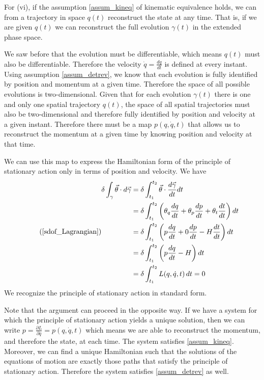 \documentclass[fleqn,10pt]{wlscirep}
\begin{document}
For (vi), if the assumption \ref{assum_kineq} of kinematic equivalence  holds, we can from a trajectory in space $q(t)$ reconstruct the state at any time. That is, if we are given $q(t)$ we can reconstruct the full evolution $\gamma(t)$ in the extended phase space.

We saw before that the evolution must be differentiable, which means $q(t)$ must also be differentiable. Therefore the velocity $\dot{q} = \frac{dq}{dt}$ is defined at every instant. Using assumption \ref{assum_detrev}, we know that each evolution is fully identified by position and momentum at a given time. Therefore the space of all possible evolutions is two-dimensional. Given that for each evolution $\gamma(t)$ there is one and only one spatial trajectory $q(t)$, the space of all spatial trajectories must also be two-dimensional and therefore fully identified by position and velocity at a given instant. Therefore there must be a map $p(q, \dot{q}, t)$ that allows us to reconstruct the momentum at a given time by knowing position and velocity at that time.

We can use this map to express the Hamiltonian form of the principle of stationary action only in terms of position and velocity. We have
\begin{equation}
\tag*{(\ref{sdof_Lagrangian})}
	\begin{aligned}
		\delta \int_\gamma \vec{\theta} \cdot d\vec{\gamma} &= \delta \int^{t_2}_{t_1} \vec{\theta} \cdot \frac{d\vec{\gamma}}{dt} dt \\
		&= \delta \int^{t_2}_{t_1} \left(\theta_q \frac{dq}{dt} + \theta_p \frac{dp}{dt} + \theta_t \frac{dt}{dt}\right) dt \\
		&= \delta\int^{t_2}_{t_1} \left(p \frac{dq}{dt} + 0 \frac{dp}{dt} - H \frac{dt}{dt}\right) dt \\
		&= \delta \int^{t_2}_{t_1} \left(p \frac{dq}{dt} - H\right) dt \\
		&= \delta \int^{t_2}_{t_1} L(q, \dot{q}, t) \, dt = 0
	\end{aligned}
\end{equation}
We recognize the principle of stationary action in standard form.

Note that the argument can proceed in the opposite way. If we have a system for which the principle of stationary action yields a unique solution, then we can write $p=\frac{\partial L}{\partial \dot{q}} = p(q, \dot{q}, t)$ which means we are able to reconstruct the momentum, and therefore the state, at each time. The system satisfies \ref{assum_kineq}. Moreover, we can find a unique Hamiltonian such that the solutions of the equations of motion are exactly those paths that satisfy the principle of stationary action. Therefore the system satisfies \ref{assum_detrev} as well.
\end{document}
